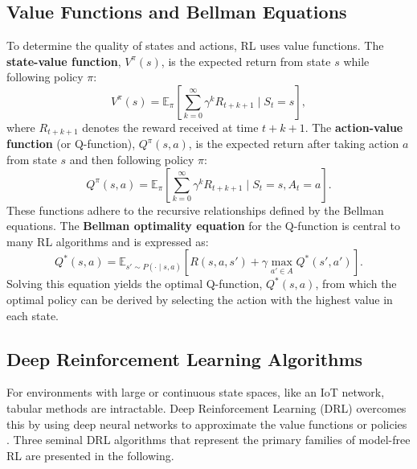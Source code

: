 \subsection{Value Functions and Bellman Equations}\label{ssec:bellman}
To determine the quality of states and actions, RL uses value functions. The \textbf{state-value function}, $V^\pi(s)$, is the expected return from state $s$ while following policy $\pi$:
\begin{equation}\label{eq:state_value_function}
V^\pi(s) = \mathbb{E}_\pi \left[ \sum_{k=0}^{\infty} \gamma^k R_{t+k+1} \;\Big|\; S_t = s \right],
\end{equation}
where $R_{t+k+1}$ denotes the reward received at time $t+k+1$. The \textbf{action-value function} (or Q-function), $Q^\pi(s, a)$, is the expected return after taking action $a$ from state $s$ and then following policy $\pi$:
\begin{equation}\label{eq:action_value_function}
Q^\pi(s,a) = \mathbb{E}_\pi \left[ \sum_{k=0}^{\infty} \gamma^k R_{t+k+1} \;\Big|\; S_t = s, A_t = a \right].
\end{equation}
These functions adhere to the recursive relationships defined by the Bellman equations. The \textbf{Bellman optimality equation} for the Q-function is central to many RL algorithms and is expressed as:
\begin{equation}\label{eq:bellman_optimality}
Q^*(s, a) = \mathbb{E}_{s' \sim P(\cdot \mid s,a)} \left[ R(s,a,s') + \gamma \max_{a' \in A} Q^*(s', a') \right].
\end{equation}
Solving this equation yields the optimal Q-function, $Q^*(s, a)$, from which the optimal policy can be derived by selecting the action with the highest value in each state.

\subsection{Deep Reinforcement Learning Algorithms}\label{ssec:drl_algorithms}
For environments with large or continuous state spaces, like an IoT network, tabular methods are intractable. Deep Reinforcement Learning (DRL) overcomes this by using deep neural networks to approximate the value functions or policies \cite{Chen2021}. Three seminal DRL algorithms that represent the primary families of model-free RL are presented in the following.

